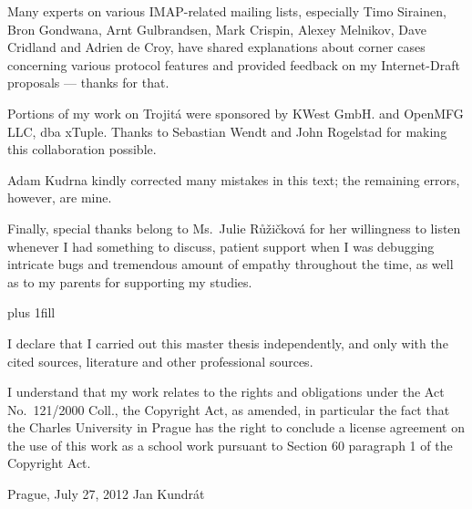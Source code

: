 \documentclass[11pt,a4paper]{report}
\begin{document}
Many experts on various IMAP-related mailing lists, especially Timo Sirainen, Bron Gondwana, Arnt Gulbrandsen, Mark
Crispin, Alexey Melnikov, Dave Cridland and Adrien de Croy, have  shared explanations about corner cases concerning
various protocol features and provided feedback on my Internet-Draft proposals --- thanks for that.

Portions of my work on Trojitá were sponsored by KWest GmbH. and OpenMFG LLC, dba xTuple.  Thanks to Sebastian Wendt and
John Rogelstad for making this collaboration possible.

Adam Kudrna kindly corrected many mistakes in this text; the remaining errors, however, are mine.

Finally, special thanks belong to Ms.~Julie Růžičková for her willingness to listen whenever I had something to
discuss, patient support when I was debugging intricate bugs and tremendous amount of empathy throughout the time, as
well as to my parents for supporting my studies.
\newpage

\vglue 0pt plus 1fill

\noindent
I declare that I carried out this master thesis independently, and only with the cited sources, literature and other
professional sources.

\medskip\noindent
I understand that my work relates to the rights and obligations under the Act No.~121/2000 Coll., the Copyright Act, as
amended, in particular the fact that the Charles University in Prague has the right to conclude a license agreement on
the use of this work as a school work pursuant to Section 60 paragraph 1 of the Copyright Act.

\vspace{30mm}

\noindent Prague, July 27, 2012 \hspace{\fill}Jan Kundrát\\

\vspace{20mm}
\newpage
\end{document}
